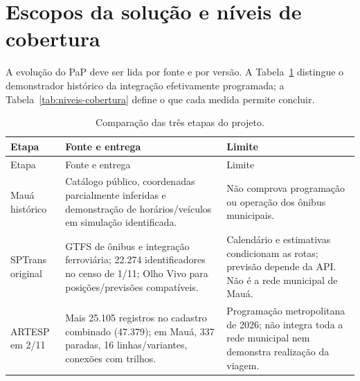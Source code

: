 \section{Escopos da solução e níveis de cobertura}\label{sec:cobertura-revisada}
A evolução do PaP deve ser lida por fonte e por versão. A Tabela~\ref{tab:cenarios-revisados} distingue o demonstrador histórico da integração efetivamente programada; a Tabela~\ref{tab:niveis-cobertura} define o que cada medida permite concluir.
\begingroup\small\SingleSpacing\setlength{\parskip}{0pt}\setlength{\tabcolsep}{4pt}
\begin{longtable}{>{\raggedright\arraybackslash}p{2.7cm}p{6.0cm}p{6.0cm}}
\caption{Comparação das três etapas do projeto.}\label{tab:cenarios-revisados}\\\hline
Etapa & Fonte e entrega & Limite\\\hline\endfirsthead
\hline Etapa & Fonte e entrega & Limite\\\hline\endhead\hline\endfoot
Mauá histórico & Catálogo público, coordenadas parcialmente inferidas e demonstração de horários/veículos em simulação identificada. & Não comprova programação ou operação dos ônibus municipais.\\[4pt]
SPTrans original & GTFS de ônibus e integração ferroviária; 22.274 identificadores no censo de 1/11; Olho Vivo para posições/previsões compatíveis. & Calendário e estimativas condicionam as rotas; previsão depende da API. Não é a rede municipal de Mauá.\\[4pt]
ARTESP em 2/11 & Mais 25.105 registros no cadastro combinado (47.379); em Mauá, 337 paradas, 16 linhas/variantes, conexões com trilhos. & Programação metropolitana de 2026; não integra toda a rede municipal nem demonstra realização da viagem.\\
\end{longtable}
